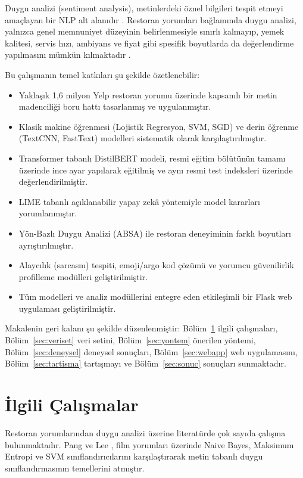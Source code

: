 \documentclass[conference]{IEEEtran}
\begin{document}
Duygu analizi (sentiment analysis), metinlerdeki öznel bilgileri tespit etmeyi amaçlayan bir NLP alt alanıdır \cite{pang2008opinion}. Restoran yorumları bağlamında duygu analizi, yalnızca genel memnuniyet düzeyinin belirlenmesiyle sınırlı kalmayıp, yemek kalitesi, servis hızı, ambiyans ve fiyat gibi spesifik boyutlarda da değerlendirme yapılmasını mümkün kılmaktadır \cite{pontiki2016semeval}.

Bu çalışmanın temel katkıları şu şekilde özetlenebilir:
\begin{itemize}
    \item Yaklaşık 1,6 milyon Yelp restoran yorumu üzerinde kapsamlı bir metin madenciliği boru hattı tasarlanmış ve uygulanmıştır.
    \item Klasik makine öğrenmesi (Lojistik Regresyon, SVM, SGD) ve derin öğrenme (TextCNN, FastText) modelleri sistematik olarak karşılaştırılmıştır.
    \item Transformer tabanlı DistilBERT modeli, resmi eğitim bölütünün tamamı üzerinde ince ayar yapılarak eğitilmiş ve aynı resmi test indeksleri üzerinde değerlendirilmiştir.
    \item LIME tabanlı açıklanabilir yapay zekâ yöntemiyle model kararları yorumlanmıştır.
    \item Yön-Bazlı Duygu Analizi (ABSA) ile restoran deneyiminin farklı boyutları ayrıştırılmıştır.
    \item Alaycılık (sarcasm) tespiti, emoji/argo kod çözümü ve yorumcu güvenilirlik profilleme modülleri geliştirilmiştir.
    \item Tüm modelleri ve analiz modüllerini entegre eden etkileşimli bir Flask web uygulaması geliştirilmiştir.
\end{itemize}

Makalenin geri kalanı şu şekilde düzenlenmiştir: Bölüm~\ref{sec:ilgili} ilgili çalışmaları, Bölüm~\ref{sec:veriset} veri setini, Bölüm~\ref{sec:yontem} önerilen yöntemi, Bölüm~\ref{sec:deneysel} deneysel sonuçları, Bölüm~\ref{sec:webapp} web uygulamasını, Bölüm~\ref{sec:tartisma} tartışmayı ve Bölüm~\ref{sec:sonuc} sonuçları sunmaktadır.

\section{İlgili Çalışmalar}
\label{sec:ilgili}

Restoran yorumlarından duygu analizi üzerine literatürde çok sayıda çalışma bulunmaktadır. Pang ve Lee \cite{pang2002thumbs}, film yorumları üzerinde Naive Bayes, Maksimum Entropi ve SVM sınıflandırıcılarını karşılaştırarak metin tabanlı duygu sınıflandırmasının temellerini atmıştır. 
\end{document}

